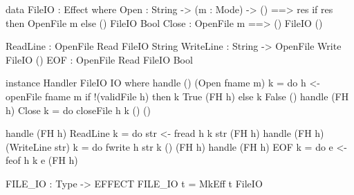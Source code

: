 \begin{code}[float=h,frame=single, caption={File I/O Effect Definition}, label=eff:filedef]
data FileIO : Effect where
     Open  : String -> (m : Mode) -> 
             {() ==> {res} if res then OpenFile m else ()} FileIO Bool
     Close : {OpenFile m ==> ()}                           FileIO () 

     ReadLine  :           {OpenFile Read}  FileIO String 
     WriteLine : String -> {OpenFile Write} FileIO ()
     EOF       :           {OpenFile Read}  FileIO Bool

instance Handler FileIO IO where
    handle () (Open fname m) k = do h <- openFile fname m
                                    if !(validFile h)
                                             then k True (FH h) 
                                             else k False ()
    handle (FH h) Close      k = do closeFile h
                                    k () ()

    handle (FH h) ReadLine        k = do str <- fread h
                                         k str (FH h)
    handle (FH h) (WriteLine str) k = do fwrite h str
                                         k () (FH h)
    handle (FH h) EOF             k = do e <- feof h
                                         k e (FH h)

FILE_IO : Type -> EFFECT
FILE_IO t = MkEff t FileIO
\end{code}
